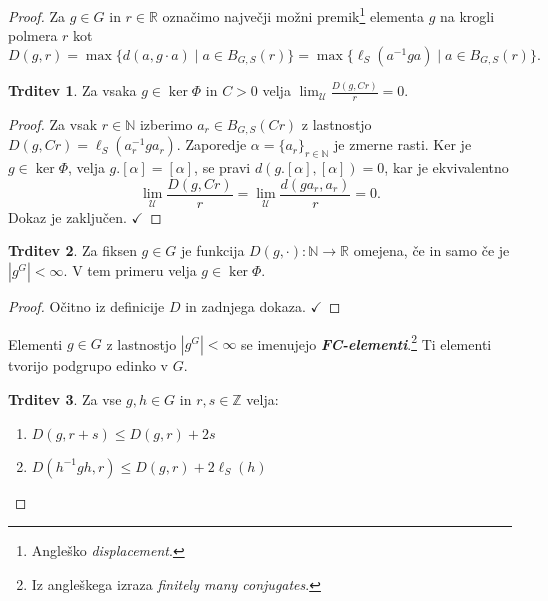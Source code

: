 \documentclass[11pt]{book}
\def\NN{\mathbb{N}}
\def\ZZ{\mathbb{Z}}
\def\RR{\mathbb{R}}
\def\UU{\mathcal{U}}
\def\definicija{\color{rdeca}\bf\em}
\def\kljuka{$\checkmark$}
\theoremstyle{definition}
\theoremstyle{zgled}
\theoremstyle{odprtproblem}
\theoremstyle{domacanaloga}
\newenvironment{dokaz}
    {\color{siva}\begin{proof}}
    {\end{proof}}
\theoremstyle{izrek}
\newtheorem*{trditev}{Trditev}
\begin{document}
\begin{dokaz}
Za $g \in G$ in $r \in \RR$ označimo največji možni premik\footnote{Angleško {\em displacement}.} elementa $g$ na krogli polmera $r$ kot
\[
D(g,r) = \max \{ d(a,g \cdot a) \mid a \in B_{G,S}(r) \} = \max \{ \ell_S(a^{-1} g a) \mid a \in B_{G,S}(r) \}.
\]

\begin{trditev}
Za vsaka $g \in \ker \Phi$ in $C > 0$ velja $\lim_\UU \frac{D(g,Cr)}{r} = 0$.
\end{trditev}

\begin{dokaz} 
Za vsak $r \in \NN$ izberimo $a_r \in B_{G,S}(Cr)$ z lastnostjo $D(g,Cr) = \ell_S(a_r^{-1} g a_r)$. Zaporedje $\alpha = \{ a_r \}_{r \in \NN}$ je zmerne rasti. Ker je $g \in \ker \Phi$, velja $g.[\alpha] = [\alpha]$, se pravi $d(g.[\alpha],[\alpha]) = 0$, kar je ekvivalentno
\[
\lim_\UU \frac{D(g, Cr)}{r} = \lim_\UU \frac{d(ga_r, a_r)}{r} = 0.
\]
Dokaz je zaključen. \kljuka
\end{dokaz}


\begin{trditev}
Za fiksen $g \in G$ je funkcija $D(g, \cdot) \colon \NN \to \RR$ omejena, če in samo če je $|g^G| < \infty$. V tem primeru velja $g \in \ker \Phi$.
\end{trditev}


\begin{dokaz}
Očitno iz definicije $D$ in zadnjega dokaza. \kljuka
\end{dokaz}


Elementi $g \in G$ z lastnostjo $|g^G| < \infty$ se imenujejo {\definicija FC-elementi}.\footnote{Iz angleškega izraza {\em finitely many conjugates}.} Ti elementi tvorijo podgrupo edinko v $G$.


\begin{trditev}
Za vse $g,h \in G$ in $r,s \in \ZZ$ velja:
\vspace{-0.5\baselineskip}
\begin{enumerate}[noitemsep]
    \item $D(g,r+s) \leq D(g,r) + 2s$
    \item $D(h^{-1} g h, r) \leq D(g,r) + 2 \ell_S(h)$ \vspace{-\baselineskip}
\end{enumerate}
\end{trditev}


\end{dokaz}
\end{document}
